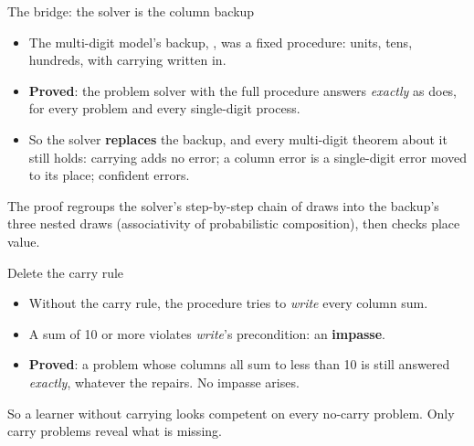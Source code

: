 \documentclass[aspectratio=169,11pt]{beamer}
\begin{document}
\begin{frame}{The bridge: the solver is the column backup}
  \begin{itemize}
    \item The multi-digit model's backup, , was a fixed procedure: units, tens, hundreds, with carrying written in.
    \item \textbf{Proved}: the problem solver with the full procedure answers \emph{exactly} as  does, for every problem and every single-digit process.
    \item So the solver \textbf{replaces} the backup, and every multi-digit theorem about it still holds: carrying adds no error; a column error is a single-digit error moved to its place; confident errors.
  \end{itemize}
  \medskip
  The proof regroups the solver's step-by-step chain of draws into the backup's three nested draws (associativity of probabilistic composition), then checks place value.
\end{frame}

\begin{frame}{Delete the carry rule}
  \begin{itemize}
    \item Without the carry rule, the procedure tries to \emph{write} every column sum.
    \item A sum of 10 or more violates \emph{write}'s precondition: an \textbf{impasse}.
    \item \textbf{Proved}: a problem whose columns all sum to less than 10 is still answered \emph{exactly}, whatever the repairs. No impasse arises.
  \end{itemize}
  \bigskip
  So a learner without carrying looks competent on every no-carry problem. Only carry problems reveal what is missing.
\end{frame}
\end{document}
